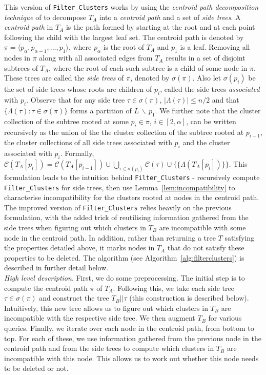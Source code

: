\documentclass{article}
\newcommand{\leafset}{\Lambda}
\begin{document}
    This version of \texttt{Filter\_Clusters} works by using the \textit{centroid path decomposition technique} of \cite{cole2000n} to decompose $T_A$ into a \textit{centroid path} and a set of \textit{side trees}. A \textit{centroid path} in $T_A$ is the path formed by starting at the root and at each point following the child with the largest leaf set. The centroid path is denoted by $\pi = \langle p_{\alpha}, p_{\alpha - 1}, ..., p_1 \rangle$, where $p_{\alpha}$ is the root of $T_A$ and $p_1$ is a leaf. Removing all nodes in $\pi$ along with all associated edges from $T_A$ results in a set of disjoint subtrees of $T_A$, where the root of each such subtree is a child of some node in $\pi$. These trees are called the \textit{side trees} of $\pi$, denoted by $\sigma(\pi)$. Also let $\sigma(p_i)$ be the set of side trees whose roots are children of $p_i$, called the side trees \textit{associated} with $p_i$. Observe that for any side tree $\tau \in \sigma(\pi)$, $|\leafset(\tau)| \leq n/2$ and that $\{\leafset(\tau) : \tau \in \sigma(\pi)\}$ forms a partition of $L\, \backslash\, {p_1}$. We further note that the cluster collection of the subtree rooted at some $p_i \in \pi$, $i \in [2, \alpha]$, can be written recursively as the union of the the cluster collection of the subtree rooted at $p_{i-1}$, the cluster collections of all side trees associated with $p_i$ and the cluster associated with $p_i$. Formally, $\mathcal{C}(T_A[p_i]) = \mathcal{C}(T_A[p_{i-1}]) \cup \bigcup_{\tau \in \sigma(p_i)} \mathcal{C}(\tau) \cup \{\{\leafset(T_A[p_i])\}\}$. This formulation leads to the intuition behind \texttt{Filter\_Clusters} - recursively compute \texttt{Filter\_Clusters} for side trees, then use Lemma~\ref{lem:incompatibility} to characterise incompatibility for the clusters rooted at nodes in the centroid path.\\

    The improved version of \texttt{Filter\_Clusters} relies heavily on the previous formulation, with the added trick of reutilising information gathered from the side trees when figuring out which clusters in $T_B$ are incompatible with some node in the centroid path. In addition, rather than returning a tree $T$ satisfying the properties detailed above, it marks nodes in $T_A$ that do not satisfy these properties to be deleted. The algorithm (see Algorithm~\ref{alg:filterclusters}) is described in further detail below.\\

    \textit{High level description}. First, we do some preprocessing. The initial step is to compute the centroid path $\pi$ of $T_A$. Following this, we take each side tree $\tau \in \sigma(\pi)$ and construct the tree $T_B||\tau$ (this construction is described below). Intuitively, this new tree allows us to figure out which clusters in $T_B$ are incompatible with the respective side tree. We then augment $T_B$ for various queries. Finally, we iterate over each node in the centroid path, from bottom to top. For each of these, we use information gathered from the previous node in the centroid path and from the side trees to compute which clusters in $T_B$ are incompatible with this node. This allows us to work out whether this node needs to be deleted or not.
\end{document}
